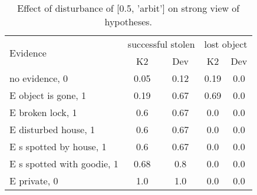 \begin{table}\begin{tabular}{l|cc|cc}\toprule\multirow{2}{*}{Evidence} & \multicolumn{2}{c}{successful stolen}& \multicolumn{2}{c}{lost object}\\& {K2} & {Dev}& {K2} & {Dev}\\\midrule
no evidence, 0 & \cellcolor{Bittersweet}0.05&\cellcolor{Bittersweet}0.12&\cellcolor{Bittersweet}0.19&\cellcolor{Bittersweet}0.0\\E object is gone, 1 & \cellcolor{Bittersweet}0.19&\cellcolor{Bittersweet}0.67&\cellcolor{Bittersweet}0.69&\cellcolor{Bittersweet}0.0\\E broken lock, 1 & \cellcolor{Bittersweet}0.6&\cellcolor{Bittersweet}0.67&0.0&0.0\\E disturbed house, 1 & \cellcolor{Bittersweet}0.6&\cellcolor{Bittersweet}0.67&0.0&0.0\\E s spotted by house, 1 & \cellcolor{Bittersweet}0.6&\cellcolor{Bittersweet}0.67&0.0&0.0\\E s spotted with goodie, 1 & \cellcolor{Bittersweet}0.68&\cellcolor{Bittersweet}0.8&0.0&0.0\\E private, 0 & 1.0&1.0&0.0&0.0\\\bottomrule\end{tabular}\caption{Effect of disturbance of [0.5, 'arbit'] on strong view of hypotheses.}\end{table}